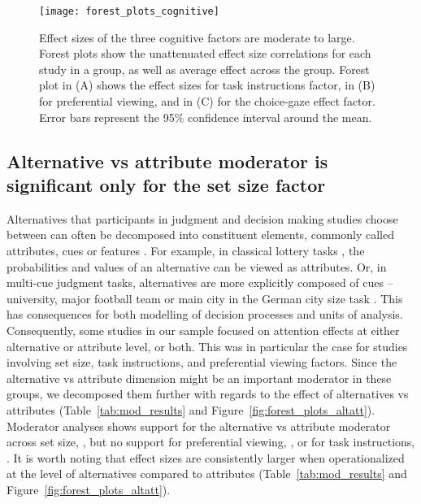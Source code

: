 \begin{figure}[!h]
\texttt{[image: forest\_plots\_cognitive]}
\centering
\caption{Effect sizes of the three cognitive factors are moderate to large. Forest plots show the unattenuated effect size correlations for each study in a group, as well as average effect across the group. Forest plot in (A) shows the effect sizes for task instructions factor, in (B) for preferential viewing, and in (C) for the choice-gaze effect factor. Error bars represent the 95\% confidence interval around the mean.}
\label{fig:forest_plots_cognitive}
\end{figure}


\subsection{Alternative vs attribute moderator is significant only for the set size factor}

Alternatives that participants in judgment and decision making studies choose between can often be decomposed into constituent elements, commonly called attributes, cues or features \citep{payne1988,tversky1972elimination,stojic2020s,gigerenzer1996reasoning,schulz2018putting,hogarth2007heuristic}. For example, in classical lottery tasks \citep{tversky1979}, the probabilities and values of an alternative can be viewed as attributes. Or, in multi-cue judgment tasks, alternatives are more explicitly composed of cues -- university, major football team or main city in the German city size task \citep{gigerenzer1996reasoning}. This has consequences for both modelling of decision processes and units of analysis. Consequently, some studies in our sample focused on attention effects at either alternative or attribute level, or both. This was in particular the case for studies involving set size, task instructions, and preferential viewing factors. Since the alternative vs attribute dimension might be an important moderator in these groups, we decomposed them further with regards to the effect of alternatives vs attributes (Table~\ref{tab:mod_results} and Figure~\ref{fig:forest_plots_altatt}). Moderator analyses shows support for the alternative vs attribute moderator across set size, , but no support for preferential viewing, , or for task instructions, . It is worth noting that effect sizes are consistently larger when operationalized at the level of alternatives compared to attributes (Table~\ref{tab:mod_results} and Figure~\ref{fig:forest_plots_altatt}). 

